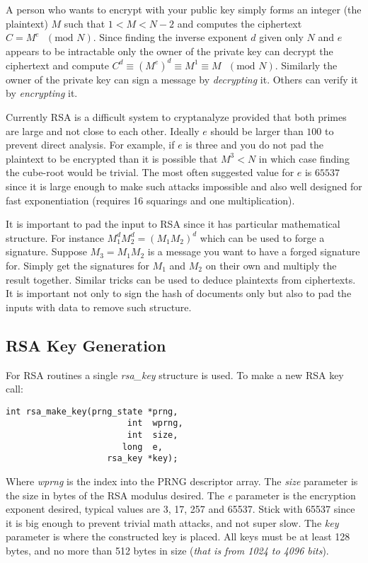 \documentclass[synpaper]{book}
\begin{document}
A person who wants to encrypt with your public key simply forms an integer (the plaintext) $M$ such that
$1 < M < N-2$ and computes the ciphertext $C = M^e\mbox{ }(\mbox{mod }N)$.  Since finding the inverse exponent $d$
given only $N$ and $e$ appears to be intractable only the owner of the private key can decrypt the ciphertext and compute
$C^d \equiv \left (M^e \right)^d \equiv M^1 \equiv M\mbox{ }(\mbox{mod }N)$.  Similarly the owner of the private key
can sign a message by \textit{decrypting} it.  Others can verify it by \textit{encrypting} it.

Currently RSA is a difficult system to cryptanalyze provided that both primes are large and not close to each other.
Ideally $e$ should be larger than $100$ to prevent direct analysis.  For example, if $e$ is three and you do not pad
the plaintext to be encrypted than it is possible that $M^3 < N$ in which case finding the cube-root would be trivial.
The most often suggested value for $e$ is $65537$ since it is large enough to make such attacks impossible and also well
designed for fast exponentiation (requires 16 squarings and one multiplication).

It is important to pad the input to RSA since it has particular mathematical structure.  For instance
$M_1^dM_2^d = (M_1M_2)^d$ which can be used to forge a signature.  Suppose $M_3 = M_1M_2$ is a message you want
to have a forged signature for.  Simply get the signatures for $M_1$ and $M_2$ on their own and multiply the result
together.  Similar tricks can be used to deduce plaintexts from ciphertexts.  It is important not only to sign
the hash of documents only but also to pad the inputs with data to remove such structure.

\subsection{RSA Key Generation}

For RSA routines a single \textit{rsa\_key} structure is used.  To make a new RSA key call:
\begin{verbatim}
int rsa_make_key(prng_state *prng,
                        int  wprng,
                        int  size,
                       long  e,
                    rsa_key *key);
\end{verbatim}

Where \textit{wprng} is the index into the PRNG descriptor array.  The \textit{size} parameter is the size in bytes of the RSA modulus desired.
The \textit{e} parameter is the encryption exponent desired, typical values are 3, 17, 257 and 65537.  Stick with 65537 since it is big enough to prevent
trivial math attacks, and not super slow.  The \textit{key} parameter is where the constructed key is placed.  All keys must be at
least 128 bytes, and no more than 512 bytes in size (\textit{that is from 1024 to 4096 bits}).
\end{document}
